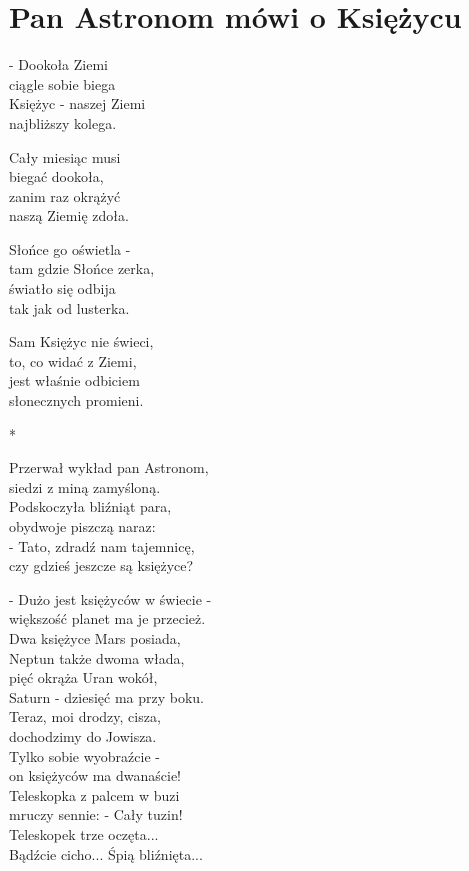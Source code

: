 \documentclass[11pt,a4pape,leqno,twoside]{book}
\begin{document}
\chapter{Pan Astronom mówi o Księżycu}
- Dookoła Ziemi\\
ciągle sobie biega\\
Księżyc - naszej Ziemi\\
najbliższy kolega.\\ \vspace{0.1cm}

Cały miesiąc musi\\
biegać dookoła,\\
zanim raz okrążyć\\
naszą Ziemię zdoła.\\ \vspace{0.1cm}

Słońce go oświetla -\\
tam gdzie Słońce zerka,\\
światło się odbija\\
tak jak od lusterka.\\ \vspace{0.1cm}

Sam Księżyc nie świeci,\\
to, co widać z Ziemi,\\
jest właśnie odbiciem\\
słonecznych promieni.\\ \vspace{0.1cm}

*\\ \vspace{0.1cm}

Przerwał wykład pan Astronom,\\
siedzi z miną zamyśloną.\\
Podskoczyła bliźniąt para,\\
obydwoje piszczą naraz:\\
- Tato, zdradź nam tajemnicę,\\
czy gdzieś jeszcze są księżyce?\\ \vspace{0.1cm}

- Dużo jest księżyców w świecie -\\
większość planet ma je przecież.\\
Dwa księżyce Mars posiada,\\
Neptun także dwoma włada,\\
pięć okrąża Uran wokół,\\
Saturn - dziesięć ma przy boku.\\
Teraz, moi drodzy, cisza,\\
dochodzimy do Jowisza.\\
Tylko sobie wyobraźcie -\\
on księżyców ma dwanaście!\\
Teleskopka z palcem w buzi\\
mruczy sennie: - Cały tuzin!\\
Teleskopek trze oczęta...\\
Bądźcie cicho... Śpią bliźnięta...
\end{document}

